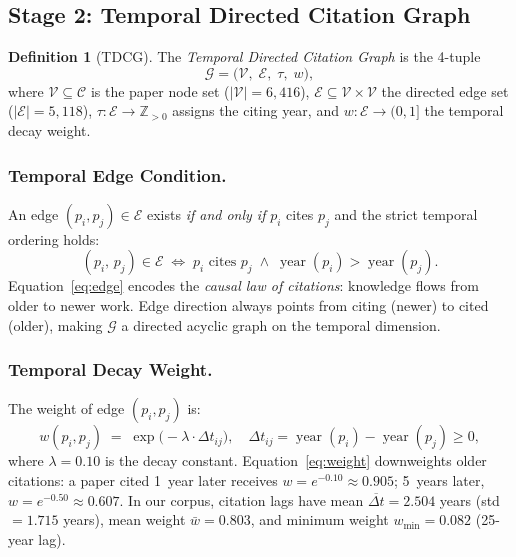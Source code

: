 \documentclass[letterpaper]{article}
\theoremstyle{plain}
\theoremstyle{definition}
\newtheorem{definition}{Definition}
\theoremstyle{remark}
\newcommand{\G}{\mathcal{G}}
\newcommand{\V}{\mathcal{V}}
\newcommand{\E}{\mathcal{E}}
\newcommand{\C}{\mathcal{C}}
\newcommand{\Z}{\mathbb{Z}}
\newcommand{\lam}{\lambda}
\newcommand{\yd}[1]{\operatorname{year}(#1)}
\newcommand{\dt}{\Delta t}
\begin{document}
\subsection{Stage 2: Temporal Directed Citation Graph}
\label{sec:tdcg}

\begin{definition}[TDCG]
\label{def:tdcg}
The \emph{Temporal Directed Citation Graph} is the 4-tuple
\begin{equation}
    \G = \bigl(\V,\; \E,\; \tau,\; w\bigr),
    \label{eq:tdcg}
\end{equation}
where $\V \subseteq \C$ is the paper node set
($|\V| = 6{,}416$),
$\E \subseteq \V \times \V$ the directed edge set
($|\E| = 5{,}118$),
$\tau : \E \to \Z_{>0}$ assigns the citing year,
and $w : \E \to (0,1]$ the temporal decay weight.
\end{definition}

\subsubsection{Temporal Edge Condition.}
An edge $(p_i, p_j) \in \E$ exists \emph{if and only if}
$p_i$ cites $p_j$ and the strict temporal ordering holds:
\begin{equation}
    (p_i,\, p_j) \in \E
    \;\iff\;
    p_i \text{ cites } p_j
    \;\wedge\;
    \yd{p_i} > \yd{p_j}.
    \label{eq:edge}
\end{equation}
Equation~\eqref{eq:edge} encodes the \emph{causal law of
citations}: knowledge flows from older to newer work.
Edge direction always points from citing (newer) to cited
(older), making $\G$ a directed acyclic graph on the temporal
dimension.

\subsubsection{Temporal Decay Weight.}
The weight of edge $(p_i, p_j)$ is:
\begin{equation}
    w(p_i, p_j)
    \;=\;
    \exp\!\bigl(-\lam \cdot \dt_{ij}\bigr),
    \quad
    \dt_{ij} = \yd{p_i} - \yd{p_j} \geq 0,
    \label{eq:weight}
\end{equation}
where $\lam = 0.10$ is the decay constant.
Equation~\eqref{eq:weight} downweights older citations:
a paper cited 1~year later receives $w = e^{-0.10} \approx 0.905$;
5~years later, $w = e^{-0.50} \approx 0.607$.
In our corpus, citation lags have mean
$\overline{\dt} = 2.504$ years (std $= 1.715$ years),
mean weight $\bar{w} = 0.803$,
and minimum weight $w_{\min} = 0.082$
(25-year lag).
\end{document}
